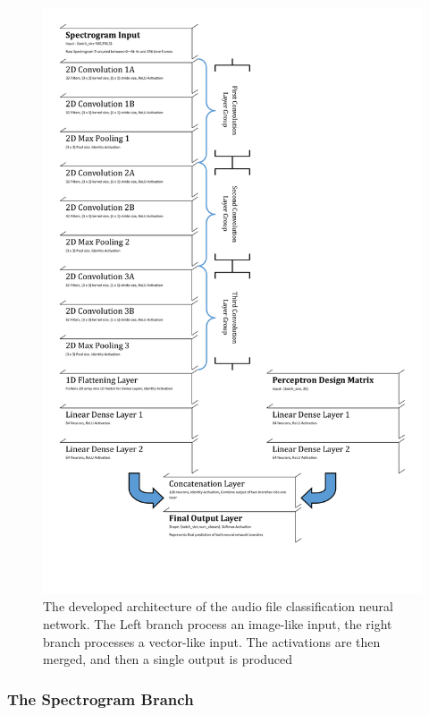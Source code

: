 \documentclass[12pt,letterpaper]{article}
\begin{document}
\begin{figure}[H]
\label{fig-NetworkArchitecture}
\begin{center}
\includegraphics[scale=0.45]{../Figures/NeuralNetworkArchitecture}
\end{center}
\caption{The developed architecture of the audio file classification neural network. The Left branch process an image-like input, the right branch processes a vector-like input. The activations are then merged, and then a single output is produced}
\end{figure}


\subsubsection{The Spectrogram Branch}
\end{document}
